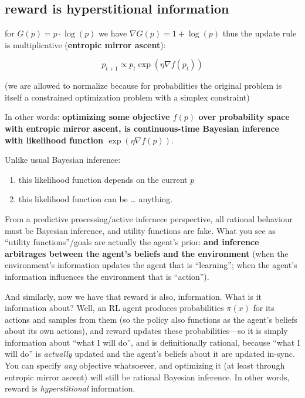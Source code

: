 \hypertarget{reward-is-hyperstitional-information}{%
\subsection{reward is hyperstitional information}\label{reward-is-hyperstitional-information}}

for \(G(p)=p\cdot\log(p)\) we have \(\nabla G(p) = 1+\log(p)\) thus the update rule is multiplicative (\textbf{entropic mirror ascent}):

\[p_{t+1} \propto p_t\exp\left(\eta\nabla f(p_t)\right)\]

(we are allowed to normalize because for probabilities the original problem is itself a constrained optimization problem with a simplex constraint)

In other words: \textbf{optimizing some objective \(f(p)\) over probability space with entropic mirror ascent, is continuous-time Bayesian inference with likelihood function \(\exp\left(\eta\nabla f(p)\right)\)}.

Unlike usual Bayesian inference:

\begin{enumerate}
\def\labelenumi{\arabic{enumi}.}
\tightlist
\item
  this likelihood function depends on the current \(p\)
\item
  this likelihood function can be \ldots{} anything.
\end{enumerate}

From a predictive processing/active infernece perspective, all rational behaviour must be Bayesian inference, and utility functions are fake. What you see as ``utility functions''/goals are actually the agent's prior: \textbf{and inference arbitrages between the agent's beliefs and the environment} (when the environment's information updates the agent that is ``learning''; when the agent's information influences the environment that is ``action'').

And similarly, now we have that reward is also, information. What is it information about? Well, an RL agent produces probabilities \(\pi(x)\) for its actions and samples from them (so the policy also functions as the agent's beliefs about its own actions), and reward updates these probabilities---so it is simply information about ``what I will do'', and is definitionally rational, because ``what I will do'' is \emph{actually} updated and the agent's beliefs about it are updated in-sync. You can specify \emph{any} objective whatsoever, and optimizing it (at least through entropic mirror ascent) will still be rational Bayesian inference. In other words, reward is \emph{hyperstitional} information.

